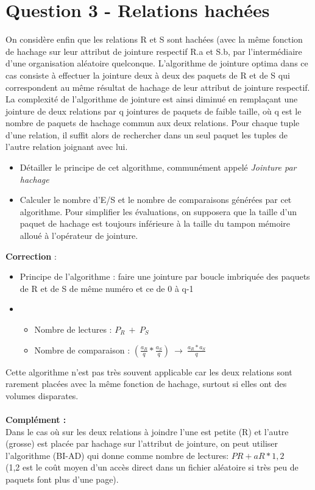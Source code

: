 \documentclass[11pt]{article}
\begin{document}
\section{Question 3 - Relations hachées}
On considère enfin que les relations R et S sont hachées (avec la même fonction de hachage sur leur attribut de jointure respectif R.a et S.b, par l'intermédiaire d'une organisation aléatoire quelconque. L'algorithme de jointure optima dans ce cas consiste à effectuer la jointure deux à deux des paquets de R et de S qui correspondent au même résultat de hachage de leur attribut de jointure respectif. La complexité de l'algorithme de jointure est ainsi diminué en remplaçant une jointure de deux relations par q jointures de paquets de faible taille, où q est le nombre de paquets de hachage commun aux deux relations. Pour chaque tuple d'une relation, il suffit alors de rechercher dans un seul paquet les tuples de l'autre  relation joignant avec lui.
\begin{itemize}
\item Détailler le principe de cet algorithme, communément appelé \textit{Jointure par hachage}
\item Calculer le nombre d'E/S et le nombre de comparaisons générées par cet algorithme. Pour simplifier les évaluations, on supposera que la taille d'un paquet de hachage est toujours inférieure à la taille du tampon mémoire alloué à l'opérateur de jointure.
\end{itemize}
\textbf{Correction} :
\begin{itemize}
\item Principe de l'algorithme :  faire une jointure par boucle imbriquée des paquets de R et de S de même numéro et ce de 0 à q-1
\item \begin{itemize}
\item Nombre de lectures : $\boxed{P_R~+~P_S}$
\item Nombre de comparaison : $\boxed{(\frac{a_R}{q}*\frac{a_S}{q})~\rightarrow~\frac{a_R*a_S}{q}}$
\end{itemize}
\end{itemize}
Cette algorithme n'est pas très souvent applicable car les deux relations sont rarement placées avec la même fonction de hachage, surtout si elles ont des volumes disparates.
\\\\\textbf{Complément :}\\
Dans le cas où sur les deux relations à joindre l'une est petite (R) et l'autre (grosse) est placée par hachage sur l'attribut de jointure, on peut utiliser l'algorithme (BI-AD) qui donne comme nombre de lectures: $\boxed{PR + aR*1,2}$  \\    
(1,2 est le coût moyen d'un accès direct dans un fichier aléatoire si très peu de paquets font plus d'une page).
\end{document}
